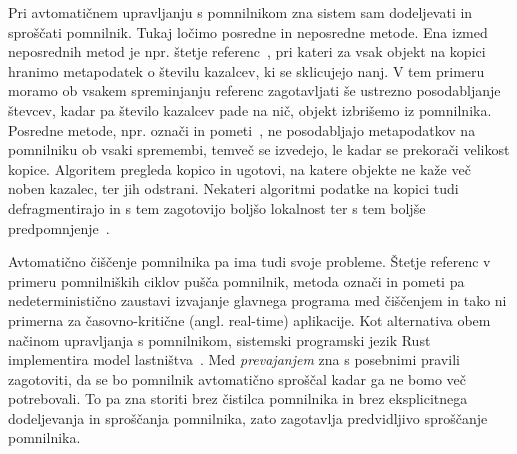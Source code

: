 \documentclass[a4paper, 12pt]{article}
\begin{document}
Pri avtomatičnem upravljanju s pomnilnikom zna sistem sam dodeljevati in sproščati pomnilnik. Tukaj ločimo posredne in neposredne metode. Ena izmed neposrednih metod je npr. štetje referenc~\cite{collins1960method}, pri kateri za vsak objekt na kopici hranimo metapodatek o številu kazalcev, ki se sklicujejo nanj. V tem primeru moramo ob vsakem spreminjanju referenc zagotavljati še ustrezno posodabljanje števcev, kadar pa število kazalcev pade na nič, objekt izbrišemo iz pomnilnika. Posredne metode, npr. označi in pometi~\cite{mccarthy1960recursive}, ne posodabljajo metapodatkov na pomnilniku ob vsaki spremembi, temveč se izvedejo, le kadar se prekorači velikost kopice. Algoritem pregleda kopico in ugotovi, na katere objekte ne kaže več noben kazalec, ter jih odstrani. Nekateri algoritmi podatke na kopici tudi defragmentirajo in s tem zagotovijo boljšo lokalnost ter s tem boljše predpomnjenje~\cite{fenichel1969lisp}. 



Avtomatično čiščenje pomnilnika pa ima tudi svoje probleme. Štetje referenc v primeru pomnilniških ciklov pušča pomnilnik, metoda označi in pometi pa nedeterministično zaustavi izvajanje glavnega programa med čiščenjem in tako ni primerna za časovno-kritične (angl. real-time) aplikacije. Kot alternativa obem načinom upravljanja s pomnilnikom, sistemski programski jezik Rust implementira model lastništva~\cite{klabnik2023rust}. Med \textit{prevajanjem} zna s posebnimi pravili zagotoviti, da se bo pomnilnik avtomatično sproščal kadar ga ne bomo več potrebovali. To pa zna storiti brez čistilca pomnilnika in brez eksplicitnega dodeljevanja in sproščanja pomnilnika, zato zagotavlja predvidljivo sproščanje pomnilnika.
\end{document}

